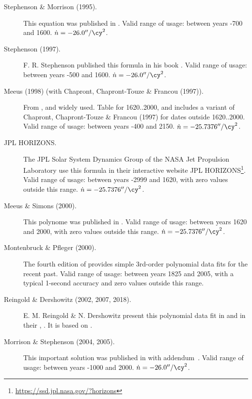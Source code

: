 \begin{description}
\item[Stephenson \& Morrison (1995).] This equation was published in . 
  Valid range of usage: between years -700 and 1600. $\dot{n}=-26.0''/\cy^2$.

\item[Stephenson (1997).] F. R. Stephenson published this formula in
  his book . Valid range of usage: between
  years -500 and 1600. $\dot{n}=-26.0''/\cy^2$.

\item[Meeus (1998) (with Chapront, Chapront-Touze \& Francou (1997)).]
  From , and widely
  used. Table for 1620..2000, and includes a variant of Chapront,
  Chapront-Touze \& Francou (1997) for dates outside 1620..2000. 
  Valid range of usage: between years -400 and 2150. $\dot{n}=-25.7376''/\cy^2$.

\item[JPL HORIZONS.] The JPL Solar System Dynamics Group of the NASA
  Jet Propulsion Laboratory use this formula in their interactive
  website JPL
  HORIZONS\footnote{\url{https://ssd.jpl.nasa.gov/?horizons}}. Valid
  range of usage: between years -2999 and 1620, with zero values
  outside this range. $\dot{n}=-25.7376''/\cy^2$.

\item[Meeus \& Simons (2000).] This polynome was published in . 
  Valid range of usage: between years 1620 and 2000, with zero values outside this
  range. $\dot{n}=-25.7376''/\cy^2$.

\item[Montenbruck \& Pfleger (2000).] The fourth edition of
   provides simple 3rd-order
  polynomial data fits for the recent past. Valid range of usage:
  between years 1825 and 2005, with a typical 1-second accuracy and
  zero values outside this range.

\item[Reingold \& Dershowitz (2002, 2007, 2018).] E. M. Reingold \&
  N. Dershowitz present this polynomial data fit in  and in their
  , . It is
  based on .

\item[Morrison \& Stephenson (2004, 2005).] This important solution
  was published in %
   with
  addendum~\citep{2005JHA....36..339M}. Valid range of usage: between
  years -1000 and 2000. $\dot{n}=-26.0''/\cy^2$.


\end{description}
